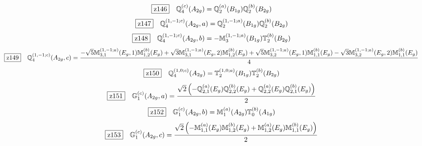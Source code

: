 \documentclass[fleqn,10pt,landscape]{jsarticle}
\begin{document}
\begin{dmath*}
\hspace*{3mm}\fbox{z146}\quad \mathbb{Q}_{4}^{(c)}(A_{2g})=\mathbb{Q}_{2}^{(a)}(B_{1g}) \mathbb{Q}_{2}^{(b)}(B_{2g})
\end{dmath*}
\begin{dmath*}
\hspace*{3mm}\fbox{z147}\quad \mathbb{Q}_{4}^{(1,-1;c)}(A_{2g},a)=\mathbb{Q}_{2}^{(1,-1;a)}(B_{1g}) \mathbb{Q}_{2}^{(b)}(B_{2g})
\end{dmath*}
\begin{dmath*}
\hspace*{3mm}\fbox{z148}\quad \mathbb{Q}_{4}^{(1,-1;c)}(A_{2g},b)=- \mathbb{M}_{3}^{(1,-1;a)}(B_{1g}) \mathbb{T}_{2}^{(b)}(B_{2g})
\end{dmath*}
\begin{dmath*}
\hspace*{3mm}\fbox{z149}\quad \mathbb{Q}_{4}^{(1,-1;c)}(A_{2g},c)=\frac{- \sqrt{5} \mathbb{M}_{3,1}^{(1,-1;a)}(E_{g},1) \mathbb{M}_{1,2}^{(b)}(E_{g}) + \sqrt{3} \mathbb{M}_{3,1}^{(1,-1;a)}(E_{g},2) \mathbb{M}_{1,2}^{(b)}(E_{g}) + \sqrt{5} \mathbb{M}_{3,2}^{(1,-1;a)}(E_{g},1) \mathbb{M}_{1,1}^{(b)}(E_{g}) - \sqrt{3} \mathbb{M}_{3,2}^{(1,-1;a)}(E_{g},2) \mathbb{M}_{1,1}^{(b)}(E_{g})}{4}
\end{dmath*}
\begin{dmath*}
\hspace*{3mm}\fbox{z150}\quad \mathbb{Q}_{4}^{(1,0;c)}(A_{2g})=\mathbb{T}_{2}^{(1,0;a)}(B_{1g}) \mathbb{T}_{2}^{(b)}(B_{2g})
\end{dmath*}
\begin{dmath*}
\hspace*{3mm}\fbox{z151}\quad \mathbb{G}_{1}^{(c)}(A_{2g},a)=\frac{\sqrt{2} \left(- \mathbb{Q}_{2,1}^{(a)}(E_{g}) \mathbb{Q}_{2,2}^{(b)}(E_{g}) + \mathbb{Q}_{2,2}^{(a)}(E_{g}) \mathbb{Q}_{2,1}^{(b)}(E_{g})\right)}{2}
\end{dmath*}
\begin{dmath*}
\hspace*{3mm}\fbox{z152}\quad \mathbb{G}_{1}^{(c)}(A_{2g},b)=\mathbb{M}_{1}^{(a)}(A_{2g}) \mathbb{T}_{0}^{(b)}(A_{1g})
\end{dmath*}
\begin{dmath*}
\hspace*{3mm}\fbox{z153}\quad \mathbb{G}_{1}^{(c)}(A_{2g},c)=\frac{\sqrt{2} \left(- \mathbb{M}_{1,1}^{(a)}(E_{g}) \mathbb{M}_{1,2}^{(b)}(E_{g}) + \mathbb{M}_{1,2}^{(a)}(E_{g}) \mathbb{M}_{1,1}^{(b)}(E_{g})\right)}{2}
\end{dmath*}
\end{document}
